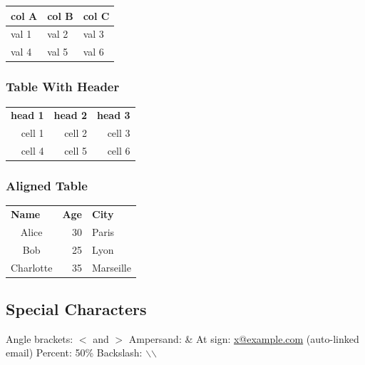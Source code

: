 \documentclass{article}
\begin{document}
\begin{center}\begin{tabular}{|l|l|l|}
\hline col A & col B & col C \\
\hline val 1 & val 2 & val 3 \\
\hline val 4 & val 5 & val 6 \\
\hline \end{tabular}\end{center}

\subsubsection*{Table With Header}

\begin{center}\begin{tabular}{lll}
\textbf{head 1} & \textbf{head 2} & \textbf{head 3} \\
\multicolumn{1}{r}{cell 1} & \multicolumn{1}{r}{cell 2} & \multicolumn{1}{r}{cell 3} \\
\multicolumn{1}{r}{cell 4} & \multicolumn{1}{r}{cell 5} & \multicolumn{1}{r}{cell 6} \\
\end{tabular}\end{center}

\subsubsection*{Aligned Table}

\begin{center}\begin{tabular}{lll}
\textbf{Name} & \textbf{Age} & \textbf{City} \\
\multicolumn{1}{c}{Alice} & \multicolumn{1}{r}{30} & Paris \\
\multicolumn{1}{c}{Bob} & \multicolumn{1}{r}{25} & Lyon \\
\multicolumn{1}{r}{Charlotte} & \multicolumn{1}{r}{35} & Marseille \\
\end{tabular}\end{center}

\subsection*{Special Characters}

Angle brackets: $<$ and $>$
Ampersand: \&
At sign: \href{mailto:x@example.com}{x@example.com} (auto-linked email)
Percent: 50\%
Backslash: $\backslash$$\backslash$
\end{document}
